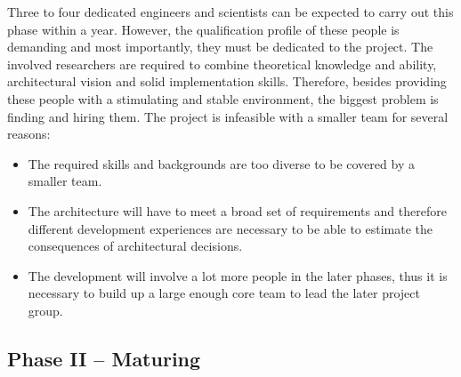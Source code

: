 \documentclass[a4paper, 10pt]{book}
\begin{document}
                                        Three to four dedicated engineers and scientists can be expected to
                                        carry out this phase within a year. However, the qualification profile
                                        of these people is demanding and most importantly, they  must be
                                        dedicated to the project. The involved researchers are required to
                                        combine theoretical knowledge and ability, architectural vision and
                                        solid implementation skills. Therefore, besides providing these people
                                        with a stimulating and stable environment, the biggest problem is
                                        finding and hiring them. The project is infeasible with a smaller team
                                        for several reasons:
                                        \begin{itemize}
                                            \item The required skills and backgrounds are too diverse to be
                                                covered by a smaller team.
                                            \item The architecture will have to meet a broad set of requirements
                                                and therefore different development experiences are necessary to be
                                                able to estimate the consequences of architectural decisions. 
                                            \item The development will involve a lot more people in the later
                                                phases, thus it is necessary to build up a large enough core team to
                                                lead the later project group.
                                        \end{itemize}

                                        \subsection{Phase II -- Maturing}
\end{document}
